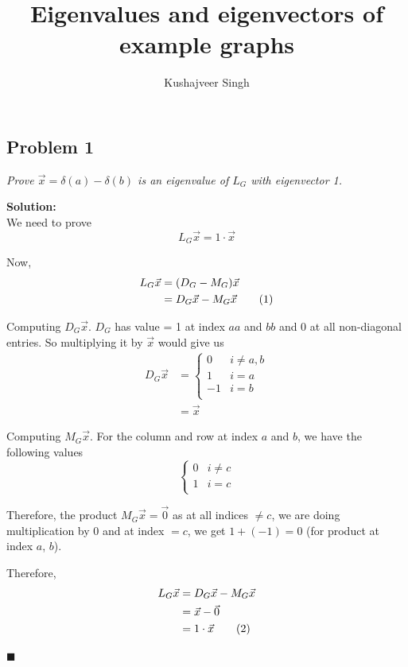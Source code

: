 \documentclass[12pt,a4paper]{article}
\title{Eigenvalues and eigenvectors of example graphs}
\author{Kushajveer Singh}
\date{}
\newcommand\numberthis{\addtocounter{equation}{1}\tag{\theequation}}
\newcommand{\rightqed}{
\begin{flushright}
$\blacksquare$
\end{flushright}
}
\newcommand{\solution}{\noindent\textbf{Solution:}\\\indent}
\begin{document}
\maketitle

\subsection*{Problem 1}
\textit{
    Prove $\vec{x}=\delta(a) - \delta(b)$ is an eigenvalue of $L_G$ with eigenvector 1.
}

\solution
We need to prove $$L_G\vec{x} = 1\cdot \vec{x}$$

Now,
\begin{align*}
    L_G\vec{x} &= (D_G - M_G)\vec{x} \\
               &= D_G\vec{x} - M_G\vec{x} \numberthis 
\end{align*}

Computing $D_G\vec{x}$. $D_G$ has value = 1 at index $aa$ and $bb$ and 0 at all non-diagonal entries. So multiplying it by $\vec{x}$ would give us
\begin{align}
    D_G\vec{x} &= \begin{cases}
                  0 & i \neq {a,b} \\
                  1 & i = a \\
                  -1 & i = b \\
                  \end{cases} \\ 
               &= \vec{x}
\end{align}

Computing $M_G\vec{x}$. For the column and row at index $a$ and $b$, we have the following values
\begin{equation}
    \begin{cases}
    0 & i \neq c \\
    1 & i = c \\
    \end{cases}
\end{equation}

Therefore, the product $M_G\vec{x} = \vec{0}$ as at all indices $\neq c$, we are doing multiplication by 0 and at index $= c$, we get $1 + (- 1) = 0$ (for product at index $a$, $b$).

Therefore,
\begin{align*}
    L_G\vec{x} &= D_G\vec{x} - M_G\vec{x} \\
               &= \vec{x} - \vec{0} \\
               &= 1\cdot \vec{x} \numberthis
\end{align*}
\rightqed
\end{document}

